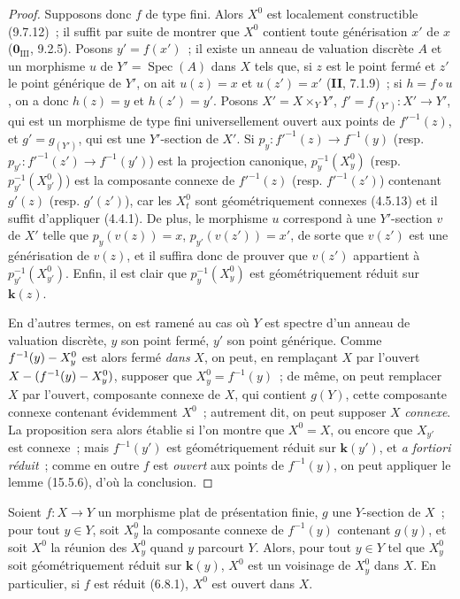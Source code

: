\begin{proof}
Supposons donc $f$ de type fini. Alors $X^0$ est localement constructible (9.7.12)~; il suffit par suite de montrer que $X^0$ contient toute générisation $x'$ de $x$ ($\mathbf{0}_{\mathrm{III}}$, 9.2.5). Posons $y'=f(x')$~; il existe un anneau de valuation discrète $A$ et un morphisme $u$ de $Y'=\operatorname{Spec}(A)$ dans $X$ tels que, si $z$ est le point fermé et $z'$ le point générique de $Y'$, on ait $u(z)=x$ et $u(z')=x'$ (\textbf{II}, 7.1.9)~; si $h=f\circ u$, on a donc $h(z)=y$ et $h(z')=y'$. Posons $X'=X\times_Y Y'$, $f'=f_{(Y')}:X'\to Y'$, qui est un morphisme de type fini universellement ouvert aux points de $f'^{-1}(z)$, et $g'=g_{(Y')}$, qui est une $Y'$-section de $X'$. Si $p_y:f'^{-1}(z)\to f^{-1}(y)$ (resp. $p_{y'}:f'^{-1}(z')\to f^{-1}(y')$) est la projection canonique, $p_y^{-1}(X_y^0)$ (resp. $p_{y'}^{-1}(X_{y'}^0)$) est la composante connexe de $f'^{-1}(z)$ (resp. $f'^{-1}(z')$) contenant $g'(z)$ (resp. $g'(z')$), car les $X_t^0$ sont géométriquement connexes (4.5.13) et il suffit d'appliquer (4.4.1). De plus, le morphisme $u$ correspond à une $Y'$-section $v$ de $X'$ telle que $p_y(v(z))=x$, $p_{y'}(v(z'))=x'$, de sorte que $v(z')$ est une générisation de $v(z)$, et il suffira donc de prouver que $v(z')$ appartient à $p_{y'}^{-1}(X_{y'}^0)$. Enfin, il est clair que $p_y^{-1}(X_y^0)$ est géométriquement réduit sur $\boldsymbol{k}(z)$.

En d'autres termes, on est ramené au cas où $Y$ est spectre d'un anneau de valuation discrète, $y$ son point fermé, $y'$ son point générique. Comme $f^{-1}(y)- X_y^0$ est alors fermé \emph{dans} $X$, on peut, en remplaçant $X$ par l'ouvert $X-(f^{-1}(y)- X_y^0)$, supposer que $X_y^0=f^{-1}(y)$~; de même, on peut remplacer $X$ par l'ouvert, composante connexe de $X$, qui contient $g(Y)$, cette composante connexe contenant évidemment $X^0$~; autrement dit, on peut supposer $X$ \emph{connexe}. La proposition sera alors établie si l'on montre que $X^0=X$, ou encore que $X_{y'}$ est connexe~; mais $f^{-1}(y')$ est géométriquement réduit sur $\boldsymbol{k}(y')$, et \emph{a fortiori réduit}~; comme en outre $f$ est \emph{ouvert} aux points de $f^{-1}(y)$, on peut appliquer le lemme (15.5.6), d'où la conclusion.
\end{proof}

\begin{corollary}[15.6.5]
\label{IV.15.6.5-fr}
Soient $f:X\to Y$ un morphisme plat de présentation finie, $g$ une $Y$-section de $X$~; pour tout $y\in Y$, soit $X_y^0$ la composante connexe de $f^{-1}(y)$ contenant $g(y)$, et soit $X^0$ la réunion des $X_y^0$ quand $y$ parcourt $Y$. Alors, pour tout $y\in Y$ tel que $X_y^0$ soit géométriquement réduit sur $\boldsymbol{k}(y)$, $X^0$ est un voisinage de $X_y^0$ dans $X$. En particulier, si $f$ est réduit \textup{(6.8.1)}, $X^0$ est ouvert dans $X$.
\end{corollary}

